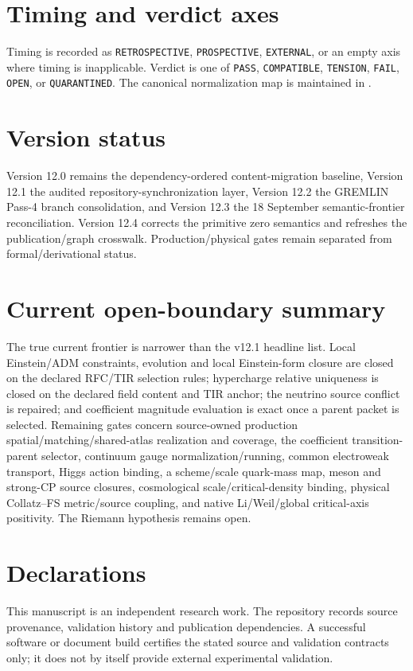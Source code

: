 \documentclass[11pt,a4paper,twoside]{book}
\theoremstyle{definition}
\begin{document}
\section*{Timing and verdict axes}
Timing is recorded as \texttt{RETROSPECTIVE}, \texttt{PROSPECTIVE}, \texttt{EXTERNAL}, or an empty axis where timing is inapplicable. Verdict is one of \texttt{PASS}, \texttt{COMPATIBLE}, \texttt{TENSION}, \texttt{FAIL}, \texttt{OPEN}, or \texttt{QUARANTINED}. The canonical normalization map is maintained in .

\section*{Version status}
Version 12.0 remains the dependency-ordered content-migration baseline, Version 12.1 the audited repository-synchronization layer, Version 12.2 the GREMLIN Pass-4 branch consolidation, and Version 12.3 the 18 September semantic-frontier reconciliation. Version 12.4 corrects the primitive zero semantics and refreshes the publication/graph crosswalk. Production/physical gates remain separated from formal/derivational status.

\section*{Current open-boundary summary}
The true current frontier is narrower than the v12.1 headline list. Local Einstein/ADM constraints, evolution and local Einstein-form closure are closed on the declared RFC/TIR selection rules; hypercharge relative uniqueness is closed on the declared field content and TIR anchor; the neutrino source conflict is repaired; and coefficient magnitude evaluation is exact once a parent packet is selected. Remaining gates concern source-owned production spatial/matching/shared-atlas realization and coverage, the coefficient transition-parent selector, continuum gauge normalization/running, common electroweak transport, Higgs action binding, a scheme/scale quark-mass map, meson and strong-CP source closures, cosmological scale/critical-density binding, physical Collatz--FS metric/source coupling, and native Li/Weil/global critical-axis positivity. The Riemann hypothesis remains open.

\section*{Declarations}
This manuscript is an independent research work. The repository records source provenance, validation history and publication dependencies. A successful software or document build certifies the stated source and validation contracts only; it does not by itself provide external experimental validation.
\end{document}
